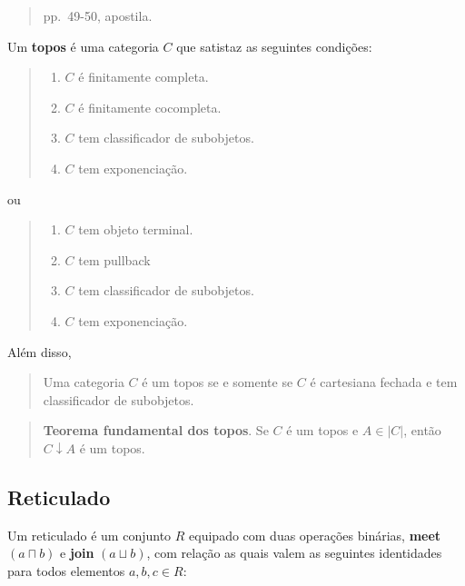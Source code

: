 \begin{quote}
pp.~49-50, apostila.
\end{quote}

Um \textbf{topos} é uma categoria \(C\) que satistaz as seguintes
condições:

\begin{quote}
\begin{enumerate}
\def\labelenumi{\arabic{enumi}.}
\tightlist
\item
  \(C\) é finitamente completa.
\item
  \(C\) é finitamente cocompleta.
\item
  \(C\) tem classificador de subobjetos.
\item
  \(C\) tem exponenciação.
\end{enumerate}
\end{quote}

ou

\begin{quote}
\begin{enumerate}
\def\labelenumi{\arabic{enumi}.}
\tightlist
\item
  \(C\) tem objeto terminal.
\item
  \(C\) tem pullback
\item
  \(C\) tem classificador de subobjetos.
\item
  \(C\) tem exponenciação.
\end{enumerate}
\end{quote}

Além disso,

\begin{quote}
Uma categoria \(C\) é um topos se e somente se \(C\) é cartesiana
fechada e tem classificador de subobjetos.
\end{quote}

\begin{quote}
\textbf{Teorema fundamental dos topos}. Se \(C\) é um topos e
\(A \in |C|\), então \(C \downarrow A\) é um topos.
\end{quote}

\hypertarget{reticulado}{%
\subsection{Reticulado}\label{reticulado}}

Um reticulado é um conjunto \(R\) equipado com duas operações binárias,
\textbf{meet} \((a \sqcap b)\) e \textbf{join} \((a \sqcup b)\), com
relação as quais valem as seguintes identidades para todos elementos
\(a,b,c \in R\):

